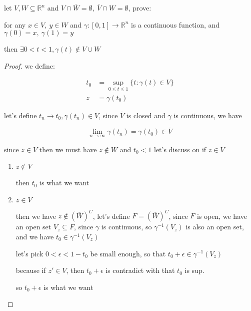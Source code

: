 \begin{thm}
    let $V, W \subseteq \mathbb{R}^n$ and $V \cap \overline{W} = \emptyset,\: \overline{V} \cap W = \emptyset$, prove:

    for any $x \in V,\: y \in W$ and $\gamma: [0,1] \to \mathbb{R}^n$ is a continuous function, and  $\gamma(0) = x,\: \gamma(1) = y$

    then $\exists 0 < t < 1, \gamma(t) \notin V \cup W$

\end{thm}

\begin{proof}
    we define: 
    
    \begin{align*}
        t_0 &= \sup_{0 \le t \le 1} \{ t: \gamma(t) \in V \} \\
           z &= \gamma(t_0)
    \end{align*}

    let's define $t_n \to t_0, \gamma(t_n) \in V$, since $\overline{V}$ is closed and $\gamma$ is continuous, we have

    \[
        \lim_{n \to \infty}\gamma(t_n) = \gamma(t_0) \in \overline{V}
    \]

    since $z \in \overline{V}$ then we must have $z \notin W$ and $t_0 < 1$ let's discuss on if $z \in V$

    \begin{enumerate}
        \item $z \notin V$

        then $t_0$ is what we want

        \item $z \in V$

        then we have $z \notin (\overline{W})^C$, let's define $F = (\overline{W})^C$, since $F$ is open, we have an open set $V_z \subseteq F$,
        since $\gamma$ is continuous, so $\gamma^{-1}(V_z)$ is also an open set, and we have $t_0 \in \gamma^{-1}(V_z)$

        let's pick $0 < \epsilon < 1 - t_0$ be small enough, so that $t_0 + \epsilon \in \gamma^{-1}(V_z)$

        because if $z' \in V$, then $t_0 + \epsilon$ is contradict with that $t_0$ is sup.

        so $t_0 + \epsilon$ is what we want
    \end{enumerate}
\end{proof}